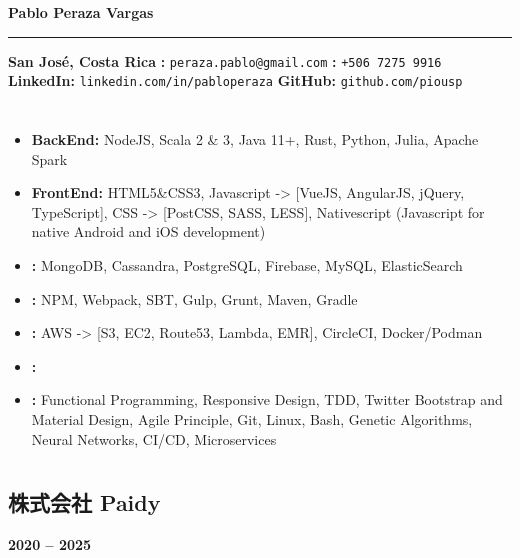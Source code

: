 \documentclass[a4paper,10pt]{article}
\begin{document}
\begin{center}
    {\Huge \textbf{Pablo Peraza Vargas}}
    \par\noindent\rule{\textwidth}{1pt}
    \vspace{5pt}
    \textbf{San José, Costa Rica} \quad
    \textbf{\correo:} \texttt{peraza.pablo@gmail.com} \quad
    \textbf{\tel:} \texttt{+506 7275 9916} \\
    \textbf{LinkedIn:} \texttt{linkedin.com/in/pabloperaza} \quad
    \textbf{GitHub:} \texttt{github.com/piousp}
\end{center}

\section*{\resumen}
\resumenTexto

\subsection*{\techSkills}
\begin{itemize}
    \item \textbf{BackEnd:} NodeJS, Scala 2 \& 3, Java 11+, Rust, Python, Julia, Apache Spark
    \item \textbf{FrontEnd:} HTML5\&CSS3, Javascript -> [VueJS, AngularJS, jQuery, TypeScript],
     CSS -> [PostCSS, SASS, LESS], Nativescript (Javascript for native Android and iOS development)
    \item \textbf{\databases:} MongoDB, Cassandra, PostgreSQL, Firebase, MySQL, ElasticSearch
    \item \textbf{\buildtools:} NPM, Webpack, SBT, Gulp, Grunt, Maven, Gradle
    \item \textbf{\env:} AWS -> [S3, EC2, Route53, Lambda, EMR], CircleCI, Docker/Podman
    \item \textbf{\lenguage:} \lengText
    \item \textbf{\other:} Functional Programming, Responsive Design, TDD, 
    Twitter Bootstrap and Material Design, Agile Principle, Git, 
    Linux, Bash, Genetic Algorithms, Neural Networks, CI/CD, Microservices
\end{itemize}

\section*{\exp}
\subsection*{株式会社 Paidy}
\textbf{2020 -- 2025} \hfill  \japan \\
\emph{\softDevSeniorScala}
\paidyText
\end{document}
